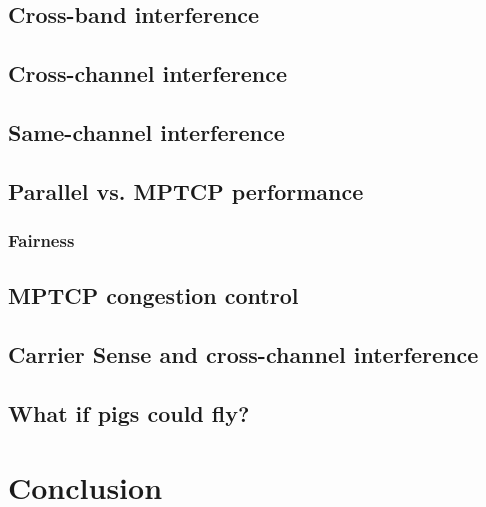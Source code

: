 \documentclass[12pt,a4paper]{article}
\begin{document}
\subsection{Cross-band interference} %
\subsection{Cross-channel interference}
\subsection{Same-channel interference}
\subsection{Parallel vs. MPTCP performance}
\subsubsection{Fairness}
\subsection{MPTCP congestion control}
\subsection{Carrier Sense and cross-channel interference}
\subsection{What if pigs could fly?} %

\section{Conclusion}

%
\end{document}
